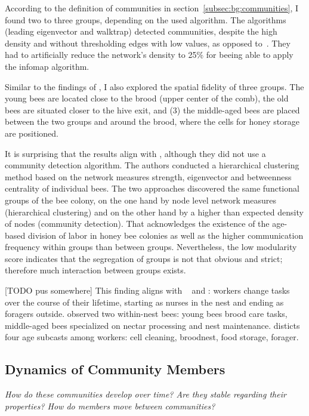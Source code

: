 According to the definition of communities in section~\ref{subsec:bg:communities}, I found two to three groups, depending on the used algorithm.
The algorithms (leading eigenvector and walktrap) detected communities, despite the high density and without thresholding edges with low values, as opposed to~\textcite{mersch2013tracking}. They had to artificially reduce the network's density to 25\% for beeing able to apply the infomap algorithm.

Similar to the findings of \textcite{baracchi2014socio}, I also explored the spatial fidelity of three groups. The young bees are located close to the brood (upper center of the comb),  the old bees are situated closer to the hive exit, and (3) the middle-aged bees are placed between the two groups and around the brood, where the cells for honey storage are positioned.

It is surprising that the results align with \textcite{baracchi2014socio}, although they did not use a community detection algorithm. The authors conducted a hierarchical clustering method based on the network measures strength, eigenvector and betweenness centrality of individual bees.
The two approaches discovered the same functional groups of the bee colony, on the one hand by node level network measures (hierarchical clustering) and on the other hand by a higher than expected density of nodes (community detection).
That acknowledges the existence of the age-based division of labor in honey bee colonies as well as the higher communication frequency within groups than between groups. Nevertheless, the low modularity score indicates that the segregation of groups is not that obvious and strict; therefore much interaction between groups exists.

[TODO pus somewhere]
This finding aligns with ~\textcite{seeley1982adaptive} and \textcite{johnson2008within}: workers change tasks over the course of their lifetime, starting as nurses in the nest and ending as foragers outside.
\textcite{johnson2008within} observed two within-nest bees: young bees brood care tasks, middle-aged bees specialized on nectar processing and nest maintenance.
\textcite{seeley1982adaptive} disticts four age subcasts among workers: cell cleaning, broodnest, food storage, forager.

\subsection{Dynamics of Community Members}
\emph{How do these communities develop over time?
Are they stable regarding their properties?
How do members move between communities?}

